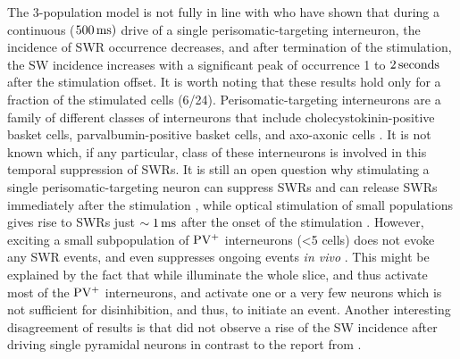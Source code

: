     The 3-population model is not fully in line with who \cite{Ellender2010}
    have shown that during a continuous ($500\, \rm ms)$ drive of a single
    perisomatic-targeting interneuron, the incidence of SWR occurrence
    decreases, and after termination of the stimulation, the SW incidence
    increases with a significant peak of occurrence 1 to $2\,\rm seconds$ after
    the stimulation offset. It is worth noting that these results hold only for
    a fraction of the stimulated cells (6/24). Perisomatic-targeting
    interneurons are a family of different classes of interneurons that include
    cholecystokinin-positive basket cells, parvalbumin-positive basket cells,
    and axo-axonic cells \citep{Freund1996}. It is not known which, if any
    particular, class of these interneurons is involved in this temporal
    suppression of SWRs. It is still an open question why stimulating a single
    perisomatic-targeting neuron can suppress SWRs and can release SWRs immediately
    after the stimulation \citep{Ellender2010}, while optical stimulation of small populations
    gives rise to SWRs just $\sim 1\, \rm ms$ after the onset of the
    stimulation \citep{Schlingloff2014}. However, exciting a small
    subpopulation of $\rm PV^+$ interneurons (<5 cells) does not evoke any SWR
    events, and even suppresses ongoing events \textit{in vivo}
    \citep{Stark2014}. This might be explained by the fact that while
    \cite{Schlingloff2014} illuminate the whole slice, and thus activate most
    of the $\rm PV^+$ interneurons, \cite{Ellender2010} and \cite{Stark2014}
    activate one or a very few neurons which is not sufficient for
    disinhibition, and thus, to initiate an event. Another interesting
    disagreement of results is that \cite{Ellender2010} did not observe a rise
    of the SW incidence after driving single pyramidal neurons in contrast to
    the report from \cite{Bazelot2016}.
    
